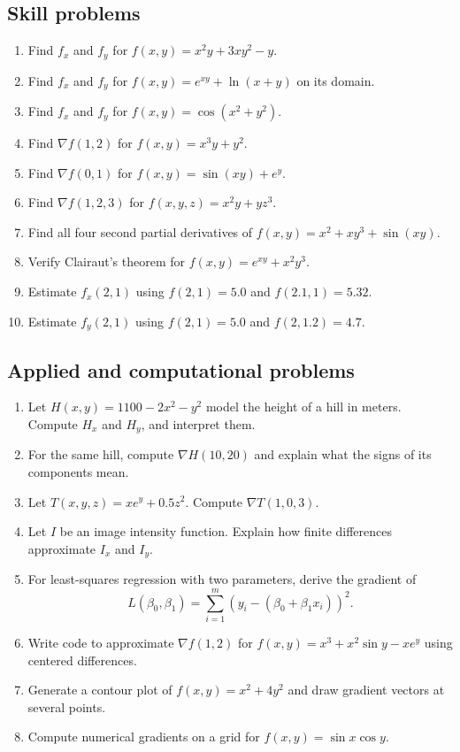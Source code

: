 \documentclass[11pt]{article}
\newcommand{\grad}{\nabla}
\begin{document}
\subsection*{Skill problems}
\begin{enumerate}[start=9]
  \item Find $f_x$ and $f_y$ for $f(x,y)=x^2y+3xy^2-y$.
  \item Find $f_x$ and $f_y$ for $f(x,y)=e^{xy}+\ln(x+y)$ on its domain.
  \item Find $f_x$ and $f_y$ for $f(x,y)=\cos(x^2+y^2)$.
  \item Find $\grad f(1,2)$ for $f(x,y)=x^3y+y^2$.
  \item Find $\grad f(0,1)$ for $f(x,y)=\sin(xy)+e^y$.
  \item Find $\grad f(1,2,3)$ for $f(x,y,z)=x^2y+yz^3$.
  \item Find all four second partial derivatives of $f(x,y)=x^2+xy^3+\sin(xy)$.
  \item Verify Clairaut's theorem for $f(x,y)=e^{xy}+x^2y^3$.
  \item Estimate $f_x(2,1)$ using $f(2,1)=5.0$ and $f(2.1,1)=5.32$.
  \item Estimate $f_y(2,1)$ using $f(2,1)=5.0$ and $f(2,1.2)=4.7$.
\end{enumerate}

\subsection*{Applied and computational problems}
\begin{enumerate}[start=19]
  \item Let $H(x,y)=1100-2x^2-y^2$ model the height of a hill in meters. Compute $H_x$ and $H_y$, and interpret them.
  \item For the same hill, compute $\grad H(10,20)$ and explain what the signs of its components mean.
  \item Let $T(x,y,z)=xe^y+0.5z^2$. Compute $\grad T(1,0,3)$.
  \item Let $I$ be an image intensity function. Explain how finite differences approximate $I_x$ and $I_y$.
  \item For least-squares regression with two parameters, derive the gradient of
  \[
  L(\beta_0,\beta_1)=\sum_{i=1}^m \left(y_i-(\beta_0+\beta_1x_i)\right)^2.
  \]
  \item Write code to approximate $\grad f(1,2)$ for $f(x,y)=x^3+x^2\sin y-xe^y$ using centered differences.
  \item Generate a contour plot of $f(x,y)=x^2+4y^2$ and draw gradient vectors at several points.
  \item Compute numerical gradients on a grid for $f(x,y)=\sin x\cos y$.
\end{enumerate}
\end{document}

